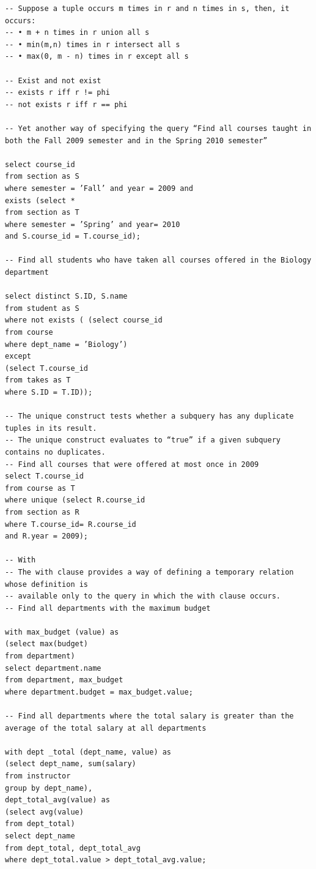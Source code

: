 \documentclass[8pt, a4paper, oneside, twocolumn]{extarticle}
\begin{document}
\begin{verbatim}
-- Suppose a tuple occurs m times in r and n times in s, then, it occurs:
-- • m + n times in r union all s
-- • min(m,n) times in r intersect all s
-- • max(0, m - n) times in r except all s

-- Exist and not exist
-- exists r iff r != phi
-- not exists r iff r == phi

-- Yet another way of specifying the query “Find all courses taught in both the Fall 2009 semester and in the Spring 2010 semester”

select course_id
from section as S
where semester = ’Fall’ and year = 2009 and
exists (select *
from section as T
where semester = ’Spring’ and year= 2010
and S.course_id = T.course_id);

-- Find all students who have taken all courses offered in the Biology department

select distinct S.ID, S.name
from student as S
where not exists ( (select course_id
from course
where dept_name = ’Biology’)
except
(select T.course_id
from takes as T
where S.ID = T.ID));

-- The unique construct tests whether a subquery has any duplicate tuples in its result.
-- The unique construct evaluates to “true” if a given subquery contains no duplicates.
-- Find all courses that were offered at most once in 2009
select T.course_id
from course as T
where unique (select R.course_id
from section as R
where T.course_id= R.course_id
and R.year = 2009);

-- With
-- The with clause provides a way of defining a temporary relation whose definition is
-- available only to the query in which the with clause occurs.
-- Find all departments with the maximum budget

with max_budget (value) as
(select max(budget)
from department)
select department.name
from department, max_budget
where department.budget = max_budget.value;

-- Find all departments where the total salary is greater than the average of the total salary at all departments

with dept _total (dept_name, value) as
(select dept_name, sum(salary)
from instructor
group by dept_name),
dept_total_avg(value) as
(select avg(value)
from dept_total)
select dept_name
from dept_total, dept_total_avg
where dept_total.value > dept_total_avg.value;


\end{verbatim}
\end{document}
